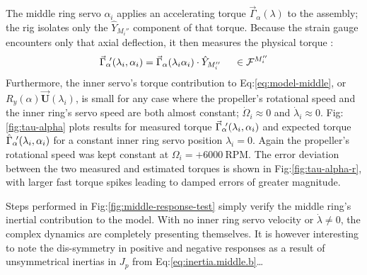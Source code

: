 \par
The middle ring servo $\alpha_i$ applies an accelerating torque $\vec{\Gamma}_\alpha(\lambda)$ to the assembly; the rig isolates only the $\hat{Y}_{M_i''}$ component of that torque. Because the strain gauge encounters only that axial deflection, it then measures the physical torque :
\begin{equation}
\vec{\Gamma}_\alpha\text{}\hspace{-2pt}'(\lambda_i,\alpha_i)=\vec{\Gamma}_\alpha(\lambda_i\alpha_i)\cdot\hat{Y}_{M_i''}~~~~\in\mathcal{F}^{M_i''}
\end{equation}
Furthermore, the inner servo's torque contribution to Eq:\ref{eq:model-middle}, or $R_y(\alpha)\vec{\mathbf{U}}(\lambda_i)$, is small for any case where the propeller's rotational speed and the inner ring's servo speed are both almost constant; $\dot{\Omega}_i\approx 0$ and $\dot{\lambda}_i\approx 0$. Fig:\ref{fig:tau-alpha} plots results for measured torque $\vec{\Gamma}_\alpha\text{}\hspace{-2pt}'(\lambda_i,\alpha_i)$ and expected torque $\hat{\Gamma}_\alpha\text{}\hspace{-2pt}'(\lambda_i,\alpha_i)$ for a constant inner ring servo position $\lambda_i=0$. Again the propeller's rotational speed was kept constant at $\Omega_i=+6000~\text{RPM}$. The error deviation between the two measured and estimated torques is shown in Fig:\ref{fig:tau-alpha-r}, with larger fast torque spikes leading to damped errors of greater magnitude.
\par
Steps performed in Fig:\ref{fig:middle-response-test} simply verify the middle ring's inertial contribution to the model. With no inner ring servo velocity or $\dot\lambda\not=0$, the complex dynamics are completely presenting themselves. It is however interesting to note the dis-symmetry in positive and negative responses as a result of unsymmetrical inertias in $J_p$ from Eq:\ref{eq:inertia.middle.b}\ldots
